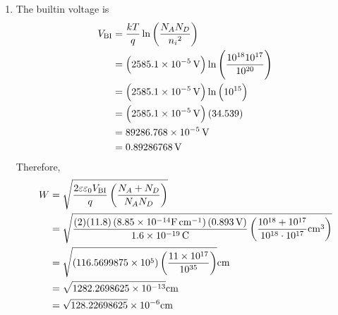 \documentclass[fleqn, a4paper, 11pt, oneside]{amsart}
\theoremstyle{definition}
\theoremstyle{theorem}
\begin{document}
\begin{solution}
	\begin{enumerate}[leftmargin=*]
		\item
			The builtin voltage is
			\begin{align*}
				V_{\text{BI}} & = \frac{k T}{q} \ln\left( \frac{N_A N_D}{{n_i}^2} \right)                                      \\
                                              & = \left( 2585.1 \times 10^{-5} \volt \right) \ln\left( \frac{10^{18} 10^{17}}{10^{20}} \right) \\
                                              & = \left( 2585.1 \times 10^{-5} \volt \right) \ln\left( 10^{15} \right)                         \\
                                              & = \left( 2585.1 \times 10^{-5} \volt \right) (34.539)                                          \\
                                              & = 89286.768 \times 10^{-5} \volt                                                               \\
                                              & = 0.89286768 \volt
			\end{align*}
			Therefore,
			\begin{align*}
				W & = \sqrt{\frac{2 \varepsilon \varepsilon_0 V_{\text{BI}}}{q} \left( \frac{N_A + N_D}{N_A N_D} \right)}                                                                                                                         \\
                                  & = \sqrt{\frac{(2) (11.8) \left( 8.85 \times 10^{-14} \si{\farad\per\centi\metre} \right) (0.893 \volt)}{1.6 \times 10^{-19} \coulomb} \left( \frac{10^{18} + 10^{17}}{10^{18} \cdot 10^{17}} \si{\centi\metre\cubed} \right)} \\
                                  & = \sqrt{\left( 116.5699875 \times 10^{5} \right) \left( \frac{11 \times 10^{17}}{10^{35}} \right)} \si{\centi\metre}                                                                                                          \\
                                  & = \sqrt{1282.2698625 \times 10^{-13}} \si{\centi\metre}                                                                                                                                                                       \\
                                  & = \sqrt{128.22698625} \times 10^{-6} \si{\centi\metre}                                                                                                                                                                        \\

\end{align*}
\end{enumerate}
\end{solution}
\end{document}

